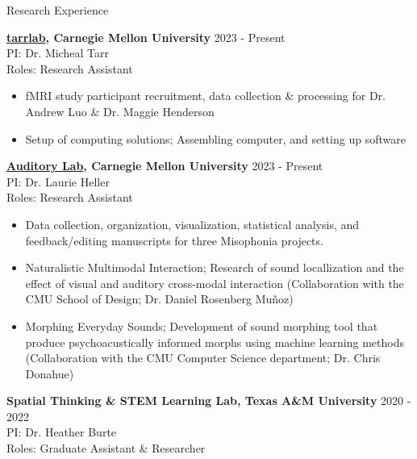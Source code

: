 \documentclass{resume} %
\begin{document}
\begin{rSection}{Research Experience}
	
	{\bf \href{https://sites.google.com/andrew.cmu.edu/tarrlab/}{tarrlab}, Carnegie Mellon University}
	\hfill { 2023 - Present}
	\\PI: Dr. Micheal Tarr
	\\Roles: Research Assistant
	
	\begin{itemize}[nosep]
		
		\item fMRI study participant recruitment, data collection \& processing for Dr. Andrew Luo \& Dr. Maggie Henderson
		\item Setup of computing solutions; Assembling computer, and setting up software
	
	\end{itemize}
	
	{\bf \href{https://www.auditorylab.org/}{Auditory Lab}, Carnegie Mellon University}
	\hfill { 2023 - Present}
	\\PI: Dr. Laurie Heller
	\\Roles: Research Assistant
	
	\begin{itemize}[nosep]
		
		\item Data collection, organization, visualization, statistical analysis, and feedback/editing manuscripts for three Misophonia projects.
		\item Naturalistic Multimodal Interaction; Research of sound locallization and the effect of visual and auditory cross-modal interaction (Collaboration with the CMU School of Design; Dr. Daniel Rosenberg Muñoz)
		\item Morphing Everyday Sounds; Development of sound morphing tool that produce psychoacustically informed morphs using machine learning methods (Collaboration with the CMU Computer Science department; Dr. Chris Donahue)
		
	\end{itemize}
    
    {\bf Spatial Thinking \& STEM Learning Lab, 
        Texas A\&M University}
    \hfill { 2020 - 2022}
    \\PI: Dr. Heather Burte
    \\Roles: Graduate Assistant \& Researcher
    
    \begin{itemize}[nosep]
        

\end{itemize}
\end{rSection}
\end{document}
